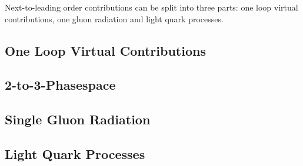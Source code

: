Next-to-leading order contributions can be split into three parts: one loop virtual contributions, one gluon radiation and light quark processes.

\subsection{One Loop Virtual Contributions}


\subsection{2-to-3-Phasespace}


\subsection{Single Gluon Radiation}


\subsection{Light Quark Processes}

